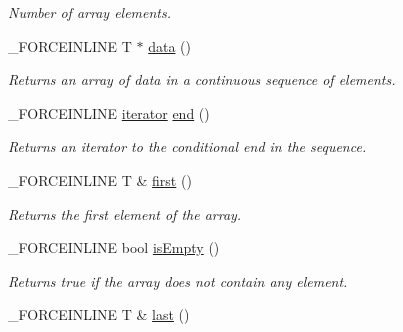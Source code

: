\begin{DoxyCompactItemize}
\begin{DoxyCompactList}\small\item\em Number of array elements. \end{DoxyCompactList}\item 
\hypertarget{classbt_1_1_vector_a9aebce6e62b2863f570dbcc33462be86}{\-\_\-\-F\-O\-R\-C\-E\-I\-N\-L\-I\-N\-E T $\ast$ \hyperlink{classbt_1_1_vector_a9aebce6e62b2863f570dbcc33462be86}{data} ()}\label{classbt_1_1_vector_a9aebce6e62b2863f570dbcc33462be86}

\begin{DoxyCompactList}\small\item\em Returns an array of data in a continuous sequence of elements. \end{DoxyCompactList}\item 
\hypertarget{classbt_1_1_vector_a6cc1d1db857f6166ebd8aff327717a6b}{\-\_\-\-F\-O\-R\-C\-E\-I\-N\-L\-I\-N\-E \hyperlink{classbt_1_1_vector_1_1iterator}{iterator} \hyperlink{classbt_1_1_vector_a6cc1d1db857f6166ebd8aff327717a6b}{end} ()}\label{classbt_1_1_vector_a6cc1d1db857f6166ebd8aff327717a6b}

\begin{DoxyCompactList}\small\item\em Returns an iterator to the conditional end in the sequence. \end{DoxyCompactList}\item 
\hypertarget{classbt_1_1_vector_a80d5821fb4ac2aa3c392dc9c9a44dfac}{\-\_\-\-F\-O\-R\-C\-E\-I\-N\-L\-I\-N\-E T \& \hyperlink{classbt_1_1_vector_a80d5821fb4ac2aa3c392dc9c9a44dfac}{first} ()}\label{classbt_1_1_vector_a80d5821fb4ac2aa3c392dc9c9a44dfac}

\begin{DoxyCompactList}\small\item\em Returns the first element of the array. \end{DoxyCompactList}\item 
\hypertarget{classbt_1_1_vector_aeda5da176841ae7781e04c928680e15b}{\-\_\-\-F\-O\-R\-C\-E\-I\-N\-L\-I\-N\-E bool \hyperlink{classbt_1_1_vector_aeda5da176841ae7781e04c928680e15b}{is\-Empty} ()}\label{classbt_1_1_vector_aeda5da176841ae7781e04c928680e15b}

\begin{DoxyCompactList}\small\item\em Returns true if the array does not contain any element. \end{DoxyCompactList}\item 
\hypertarget{classbt_1_1_vector_ae424f3814b151ff9a1206e520020dd63}{\-\_\-\-F\-O\-R\-C\-E\-I\-N\-L\-I\-N\-E T \& \hyperlink{classbt_1_1_vector_ae424f3814b151ff9a1206e520020dd63}{last} ()}\label{classbt_1_1_vector_ae424f3814b151ff9a1206e520020dd63}


\end{DoxyCompactItemize}

